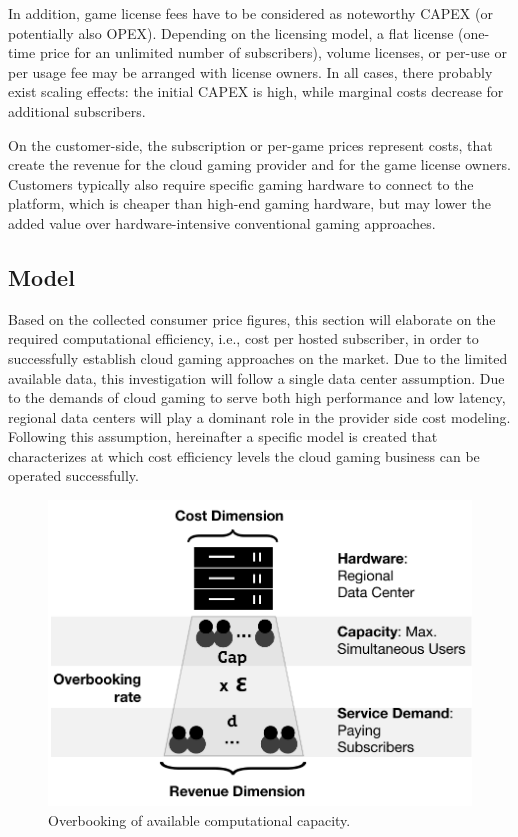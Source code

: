 In addition, game license fees have to be considered as noteworthy \gls{CAPEX} (or potentially also \gls{OPEX}). Depending on the licensing model, a flat license (one-time price for an unlimited number of subscribers), volume licenses, or per-use or per usage fee may be arranged with license owners. In all cases, there probably exist scaling effects: the initial \gls{CAPEX} is high, while marginal costs decrease for additional subscribers.

On the customer-side, the subscription or per-game prices represent costs, that create the revenue for the cloud gaming provider and for the game license owners. Customers typically also require specific gaming hardware to connect to the platform, which is cheaper than high-end gaming hardware, but may lower the added value over hardware-intensive conventional gaming approaches.

\subsection{Model}

Based on the collected consumer price figures, this section will elaborate on the required computational efficiency, i.e., cost per hosted subscriber, in order to successfully establish cloud gaming approaches on the market. Due to the limited available data, this investigation will follow a single data center assumption. Due to the demands of cloud gaming to serve both high performance and low latency, regional data centers will play a dominant role in the provider side cost modeling. Following this assumption, hereinafter a specific model is created that characterizes at which cost efficiency levels the cloud gaming business can be operated successfully.



\begin{figure}[!t]
	\centering
	\includegraphics[width=0.75\columnwidth]{images/overbooking_datacenterNG.pdf}
	\caption{Overbooking of available computational capacity.}
\label{fig:overbooking_datacenter}
\end{figure}

